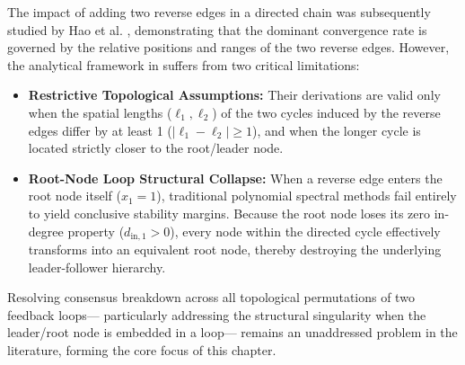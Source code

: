 The impact of adding two reverse edges in a directed chain was subsequently studied by Hao et al. \cite{hao2019role}, demonstrating that the dominant convergence rate is governed by the relative positions and ranges of the two reverse edges. However, the analytical framework in \cite{hao2019role} suffers from two critical limitations:
\begin{itemize}
\item \textbf{Restrictive Topological Assumptions:} Their derivations are valid only when the spatial lengths ($\ell_1, \ell_2$) of the two cycles induced by the reverse edges differ by at least 1 ($\vert{}\ell_1 - \ell_2\vert{} \ge 1$), and when the longer cycle is located strictly closer to the root/leader node.
\item \textbf{Root-Node Loop Structural Collapse:} When a reverse edge enters the root node itself ($x_1 = 1$), traditional polynomial spectral methods fail entirely to yield conclusive stability margins. Because the root node loses its zero in-degree property ($d_{\text{in},1} > 0$), every node within the directed cycle effectively transforms into an equivalent root node, thereby destroying the underlying leader-follower hierarchy.
\end{itemize}
Resolving consensus breakdown across all topological permutations of two feedback loops— particularly addressing the structural singularity when the leader/root node is embedded in a loop— remains an unaddressed problem in the literature, forming the core focus of this chapter.

